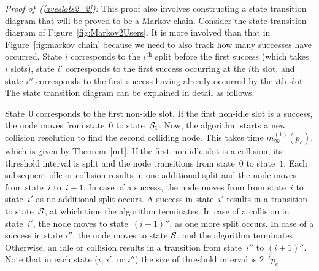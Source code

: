 \documentclass[12pt,draftcls,peerreview, onecolumn]{IEEEtran}
\newcommand{\eqn}[1]{(\ref{#1})}
\newcommand{\kth}{^{{\mathrm{th}}}}
\newcommand{\aveslotsQ}[2]{m_{#1}^{(#2)}}
\newcommand{\success}{{\cal S}}
\begin{document}
{\it Proof of~\eqn{aveslots2_2}:} This proof also involves
constructing a state transition diagram that will be proved to be a
Markov chain. Consider the state transition diagram of
Figure~\ref{fig:Markov2Users}. It is more involved than that in
Figure~\ref{fig:markov chain} because we need to also track how many
successes have occurred.  State $i$ corresponds to the $i\kth$ split
before the first success (which takes $i$ slots), state $i'$
corresponds to the first success occurring at the $i$th slot, and
state $i''$ corresponds to the first success having already occurred
by the $i$th slot. The state transition diagram can be explained in
detail as follows.

State~$0$ corresponds to the first non-idle slot. If the first
non-idle slot is a success, the node moves from state~$0$ to
state~$\success_1$. Now, the algorithm starts a new collision
resolution to find the second colliding node. This takes time
$\aveslotsQ{\infty}{1}(p_e)$, which is given by Theorem~\ref{m1}. If
the first non-idle slot is a collision, its threshold interval is
split and the node transitions from state~$0$ to state~$1$. Each
subsequent idle or collision results in one additional split and the
node moves from state~$i$ to~$i+1$.  In case of a success, the node
moves from from state~$i$ to state~$i'$ as no additional split occurs.
A success in state~$i'$ results in a transition to state~$\success$,
at which time the algorithm terminates.  In case of a collision in
state~$i'$, the node moves to state~$(i+1)''$, as one more split
occurs.  In case of a success in state $i''$, the node moves to state
$\success$, and the algorithm terminates. Otherwise, an idle or
collision results in a transition from state~$i''$ to $(i+1)''$.  Note
that in each state ($i$, $i'$, or $i''$) the size of threshold
interval is $2^{-i}p_e$.
\end{document}
